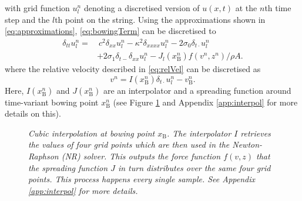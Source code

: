 \documentclass[twoside,a4paper,dvipsnames]{article}
\begin{document}
with grid function $u_l^n$ denoting a discretised version of $u(x,t)$ at the $n$th time step and the $l$th point on the string. Using the approximations shown in \eqref{eq:approximations}, \eqref{eq:bowingTerm} can be discretised to
\begin{equation}
  \begin{aligned}
    \label{eq:FDS}
        \delta_{tt} u_l^n = &\: c^2 \delta_{xx} u_l^n -\kappa^2\delta_{xxxx} u_l^n - 2\sigma_0\delta_{t\cdot} u_l^n
        \\ 
        &+ 2\sigma_1\delta_{t-}\delta_{xx}u_l^n - J_{l}(x_\text{B}^n)f(v^n, z^n) / \rho A.
    \end{aligned}
\end{equation}
where the relative velocity described in \eqref{eq:relVel} can be discretised as
\begin{equation}\label{eq:discRelVel}
v^n = I(x_\text{B}^n)\delta_{t\cdot}u_l^n -  v_\text{B}^n.
\end{equation}
Here, $I(x_\text{B}^n)$ and $J(x_\text{B}^n)$ are an interpolator and a spreading function around time-variant bowing point $x_\text{B}^n$ (see Figure \ref{fig:interpol} and Appendix \ref{app:interpol} for more details on this).
\begin{figure}[h]
    \centering
    \caption{\it Cubic interpolation at bowing point $x_\text{B}$. The interpolator $I$ retrieves the values of four grid points which are then used in the Newton-Raphson (NR) solver. This outputs the force function $f(v,z)$ that the spreading function $J$ in turn distributes over the same four grid points. This process happens every single sample. See Appendix \ref{app:interpol} for more details.}
    \label{fig:interpol}
\end{figure}
\end{document}
